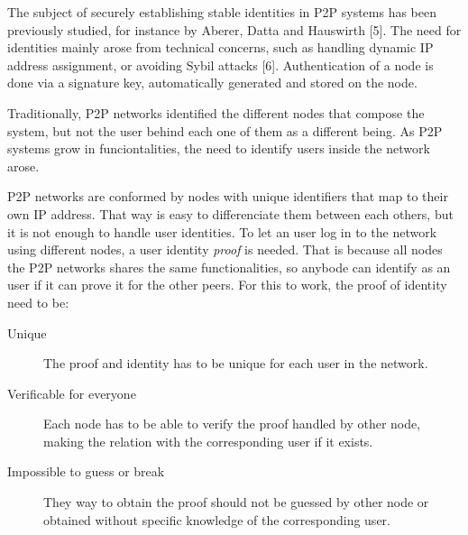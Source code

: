 The subject of securely establishing stable identities in P2P
systems has been previously studied, for instance by Aberer,
Datta and Hauswirth [5]. The need for identities mainly arose
from technical concerns, such as handling dynamic IP address
assignment, or avoiding Sybil attacks [6]. Authentication of a
node is done via a signature key, automatically generated and
stored on the node.

Traditionally, P2P networks identified the different nodes that compose the
system, but not the user behind each one of them as a different being.
As P2P systems grow in funciontalities, the need to identify users inside the
network arose.


P2P networks are conformed by nodes with unique identifiers that map to their
own IP address. That way is easy to differenciate them between each others, but
it is not enough to handle user identities. To let an user log in to the
network using different nodes, a user identity \textit{proof} is needed. That
is because all nodes the P2P networks shares the same functionalities, so
anybode can identify as an user if it can prove it for the other peers. For
this to work, the proof of identity need to be:
\begin{description}
  \item[Unique] The proof and identity has to be unique for each user in the network.

  \item[Verificable for everyone]  Each node has to be able to verify the proof
    handled by other node, making the relation with the corresponding user if it
    exists.
  \item[Impossible to guess or break] They way to obtain the proof should not
    be guessed by other node or obtained without specific knowledge of the
    corresponding user.
\end{description}




